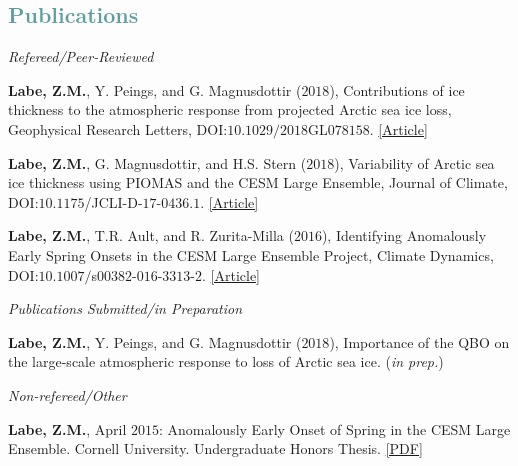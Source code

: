 \documentclass[margin,line,palatino,courier,10pt]{res}
\begin{document}
\begin{resume}
\section{\sc \large{\textcolor{CadetBlue}{Publications}}}
\textit{Refereed/Peer-Reviewed}
\vspace*{-0.1in}\\
\begin{etaremune}[leftmargin=0in,topsep=0in,parsep=0in]
\item \textbf{Labe, Z.M.}, Y. Peings, and G. Magnusdottir ($2018$), Contributions of ice thickness to the atmospheric response from projected Arctic sea ice loss, Geophysical Research Letters, DOI:$10.1029/2018$GL$078158$. \href{https://agupubs.onlinelibrary.wiley.com/doi/10.1029/2018GL078158}{[Article]}\\
\item \textbf{Labe, Z.M.}, G. Magnusdottir, and H.S. Stern ($2018$), Variability of Arctic sea ice thickness using PIOMAS and the CESM Large Ensemble, Journal of Climate, DOI:$10.1175$/JCLI-D-$17$-$0436.1$. \href{https://journals.ametsoc.org/doi/abs/10.1175/JCLI-D-17-0436.1}{[Article]}\\
\item \textbf{Labe, Z.M.}, T.R. Ault, and R. Zurita-Milla ($2016$), Identifying Anomalously Early Spring Onsets in the CESM Large Ensemble Project, Climate Dynamics, DOI:$10.1007/$s$00382$-$016$-$3313$-$2$. \href{http://link.springer.com/article/10.1007/s00382-016-3313-2}{[Article]}
\end{etaremune}

\textit{Publications Submitted/in Preparation}
\vspace*{-0.1in}\\
\begin{etaremune}[leftmargin=0in,topsep=0in,parsep=0in]
\item \textbf{Labe, Z.M.}, Y. Peings, and G. Magnusdottir ($2018$), Importance of the QBO on the large-scale atmospheric response to loss of Arctic sea ice. (\textit{in prep.})
\end{etaremune}

\textit{Non-refereed/Other}
\vspace*{-0.1in}\\
\begin{etaremune}[leftmargin=0in,topsep=0in,parsep=0in]
\item \textbf{Labe, Z.M.}, April $2015$: Anomalously Early Onset of Spring in the CESM Large Ensemble. Cornell University. Undergraduate Honors Thesis. \href{http://sites.uci.edu/zlabe/files/2015/11/Labe_Thesis2015.pdf}{[PDF]}
\end{etaremune}


\end{resume}
\end{document}
